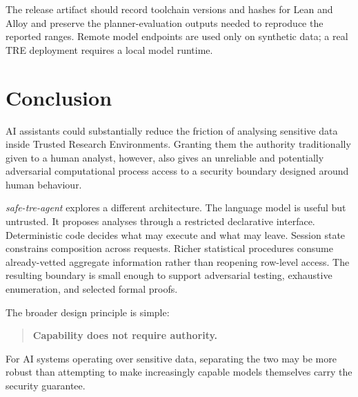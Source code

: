 \documentclass[11pt,a4paper]{article}
\begin{document}
The release artifact should record toolchain versions and hashes for Lean and
Alloy and preserve the planner-evaluation outputs needed to reproduce the
reported ranges. Remote model endpoints are used only on synthetic data; a real
TRE deployment requires a local model runtime.

\section{Conclusion}
\label{sec:conclusion}

AI assistants could substantially reduce the friction of analysing sensitive
data inside Trusted Research Environments. Granting them the authority
traditionally given to a human analyst, however, also gives an unreliable and
potentially adversarial computational process access to a security boundary
designed around human behaviour.

\textit{safe-tre-agent} explores a different architecture. The language model
is useful but untrusted. It proposes analyses through a restricted declarative
interface. Deterministic code decides what may execute and what may leave.
Session state constrains composition across requests. Richer statistical
procedures consume already-vetted aggregate information rather than reopening
row-level access. The resulting boundary is small enough to support adversarial
testing, exhaustive enumeration, and selected formal proofs.

The broader design principle is simple:

\begin{quote}
\textbf{Capability does not require authority.}
\end{quote}

For AI systems operating over sensitive data, separating the two may be more
robust than attempting to make increasingly capable models themselves carry the
security guarantee.



\end{document}

